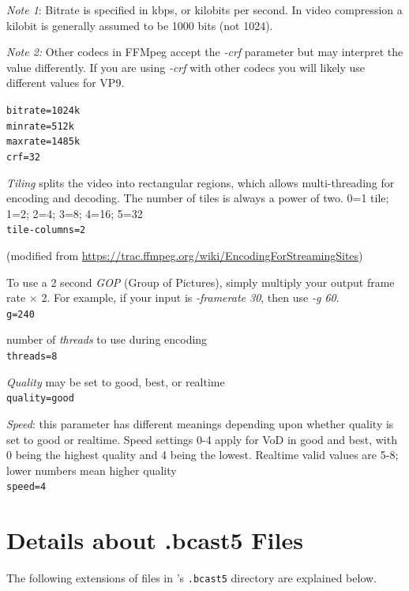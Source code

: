 \textit{Note 1}: Bitrate is specified in kbps, or kilobits per second. In video compression a kilobit is generally assumed to be 1000 bits (not 1024).

\textit{Note 2:} Other codecs in FFMpeg accept the \textit{-crf} parameter but may interpret the value differently. If you are using \textit{-crf} with other codecs you will likely use different values for VP9.

\texttt{bitrate=1024k}\\
\texttt{minrate=512k}\\
\texttt{maxrate=1485k}\\
\texttt{crf=32}

\textit{Tiling} splits the video into rectangular regions, which allows multi-threading for encoding and decoding. The number of tiles is always a power of two. 0=1 tile; 1=2; 2=4; 3=8; 4=16; 5=32\\
\texttt{tile-columns=2}

(modified from {\small \url{https://trac.ffmpeg.org/wiki/EncodingForStreamingSites}})

To use a 2 second \textit{GOP} (Group of Pictures), simply multiply your output frame rate $\times$ 2. For example, if your input is \textit{-framerate 30}, then use \textit{-g 60}.\\
\texttt{g=240}

number of \textit{threads} to use during encoding\\
\texttt{threads=8}

\textit{Quality} may be set to good, best, or realtime\\
\texttt{quality=good}

\textit{Speed}: this parameter has different meanings depending upon whether quality is set to good or realtime. Speed settings 0-4 apply for VoD in good and best, with 0 being the highest quality and 4 being the lowest. Realtime valid values are 5-8; lower numbers mean higher quality\\
\texttt{speed=4}

\section{Details about .bcast5 Files}
\label{sec:details_.bcast5_files}

The following extensions of files in \CGG{}'s \texttt{.bcast5} directory are explained below.

